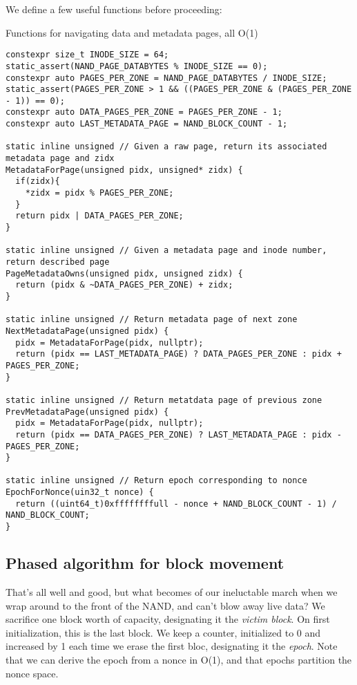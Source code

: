\documentclass[letterpaper,10pt]{article}
\begin{document}
We define a few useful functions before proceeding:

\begin{listing}[ht]
\caption{Functions for navigating data and metadata pages, all O(1)}
\begin{verbatim}
constexpr size_t INODE_SIZE = 64;
static_assert(NAND_PAGE_DATABYTES % INODE_SIZE == 0);
constexpr auto PAGES_PER_ZONE = NAND_PAGE_DATABYTES / INODE_SIZE;
static_assert(PAGES_PER_ZONE > 1 && ((PAGES_PER_ZONE & (PAGES_PER_ZONE - 1)) == 0);
constexpr auto DATA_PAGES_PER_ZONE = PAGES_PER_ZONE - 1;
constexpr auto LAST_METADATA_PAGE = NAND_BLOCK_COUNT - 1;

static inline unsigned // Given a raw page, return its associated metadata page and zidx
MetadataForPage(unsigned pidx, unsigned* zidx) {
  if(zidx){
    *zidx = pidx % PAGES_PER_ZONE;
  }
  return pidx | DATA_PAGES_PER_ZONE;
}

static inline unsigned // Given a metadata page and inode number, return described page
PageMetadataOwns(unsigned pidx, unsigned zidx) {
  return (pidx & ~DATA_PAGES_PER_ZONE) + zidx;
}

static inline unsigned // Return metadata page of next zone
NextMetadataPage(unsigned pidx) {
  pidx = MetadataForPage(pidx, nullptr);
  return (pidx == LAST_METADATA_PAGE) ? DATA_PAGES_PER_ZONE : pidx + PAGES_PER_ZONE;
}

static inline unsigned // Return metatdata page of previous zone
PrevMetadataPage(unsigned pidx) {
  pidx = MetadataForPage(pidx, nullptr);
  return (pidx == DATA_PAGES_PER_ZONE) ? LAST_METADATA_PAGE : pidx - PAGES_PER_ZONE;
}

static inline unsigned // Return epoch corresponding to nonce
EpochForNonce(uin32_t nonce) {
  return ((uint64_t)0xffffffffull - nonce + NAND_BLOCK_COUNT - 1) / NAND_BLOCK_COUNT;
}
\end{verbatim}
\end{listing}

\subsection{Phased algorithm for block movement}
That's all well and good, but what becomes of our ineluctable march when we
wrap around to the front of the NAND, and can't blow away live data? We
sacrifice one block worth of capacity, designating it the \textit{victim
  block}. On first initialization, this is the last block. We keep a counter,
initialized to 0 and increased by 1 each time we erase the first bloc,
designating it the \textit{epoch}. Note that we can derive the epoch from a
nonce in O(1), and that epochs partition the nonce space.
\end{document}
